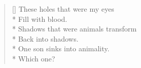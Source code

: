 \label{ch:lear_bd}
\settowidth{\versewidth}{Shadows that were animals transform}
\begin{verse}[\versewidth]
These holes that were my eyes\\*
Fill with blood.\\*
Shadows that were animals transform\\*
Back into shadows.\\*
One son sinks into animality.\\*
Which one?
\end{verse}
